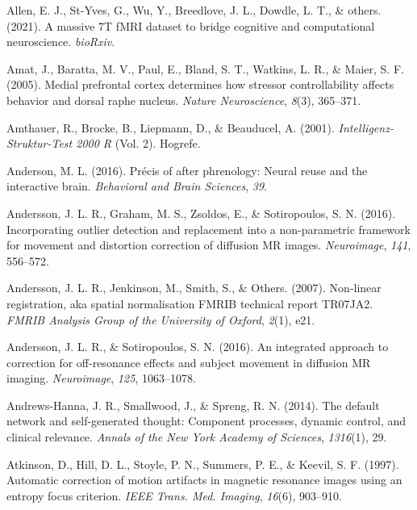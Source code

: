 \documentclass[11pt,american,]{memoir} %
\begin{document}
\leavevmode\hypertarget{ref-Allen2021-zd}{}%
Allen, E. J., St-Yves, G., Wu, Y., Breedlove, J. L., Dowdle, L. T., \& others. (2021). A massive 7T fMRI dataset to bridge cognitive and computational neuroscience. \emph{bioRxiv}.

\leavevmode\hypertarget{ref-amat2005medial}{}%
Amat, J., Baratta, M. V., Paul, E., Bland, S. T., Watkins, L. R., \& Maier, S. F. (2005). Medial prefrontal cortex determines how stressor controllability affects behavior and dorsal raphe nucleus. \emph{Nature Neuroscience}, \emph{8}(3), 365--371.

\leavevmode\hypertarget{ref-Amthauer2001-yg}{}%
Amthauer, R., Brocke, B., Liepmann, D., \& Beauducel, A. (2001). \emph{Intelligenz-Struktur-Test 2000 R} (Vol. 2). Hogrefe.

\leavevmode\hypertarget{ref-anderson2016precis}{}%
Anderson, M. L. (2016). Précis of after phrenology: Neural reuse and the interactive brain. \emph{Behavioral and Brain Sciences}, \emph{39}.

\leavevmode\hypertarget{ref-Andersson2016-nm}{}%
Andersson, J. L. R., Graham, M. S., Zsoldos, E., \& Sotiropoulos, S. N. (2016). Incorporating outlier detection and replacement into a non-parametric framework for movement and distortion correction of diffusion MR images. \emph{Neuroimage}, \emph{141}, 556--572.

\leavevmode\hypertarget{ref-Andersson2007-st}{}%
Andersson, J. L. R., Jenkinson, M., Smith, S., \& Others. (2007). Non-linear registration, aka spatial normalisation FMRIB technical report TR07JA2. \emph{FMRIB Analysis Group of the University of Oxford}, \emph{2}(1), e21.

\leavevmode\hypertarget{ref-Andersson2016-pg}{}%
Andersson, J. L. R., \& Sotiropoulos, S. N. (2016). An integrated approach to correction for off-resonance effects and subject movement in diffusion MR imaging. \emph{Neuroimage}, \emph{125}, 1063--1078.

\leavevmode\hypertarget{ref-andrews2014default}{}%
Andrews-Hanna, J. R., Smallwood, J., \& Spreng, R. N. (2014). The default network and self-generated thought: Component processes, dynamic control, and clinical relevance. \emph{Annals of the New York Academy of Sciences}, \emph{1316}(1), 29.

\leavevmode\hypertarget{ref-Atkinson1997-eu}{}%
Atkinson, D., Hill, D. L., Stoyle, P. N., Summers, P. E., \& Keevil, S. F. (1997). Automatic correction of motion artifacts in magnetic resonance images using an entropy focus criterion. \emph{IEEE Trans. Med. Imaging}, \emph{16}(6), 903--910.
\end{document}
